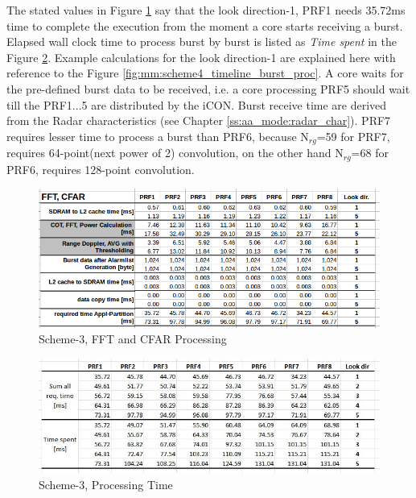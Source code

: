 The stated values in Figure \ref{fig:mm:scheme4_fft} say that the look direction-1, PRF1 needs 35.72ms time to complete the execution from the moment a core starts receiving a burst. Elapsed wall clock time to process burst by burst is listed as \textsl{Time spent} in the Figure \ref{fig:mm:scheme4_elapsed_time}. Example calculations for the look direction-1 are explained here with reference to the Figure \ref{fig:mm:scheme4_timeline_burst_proc}. A core waits for the pre-defined burst data to be received, i.e. a core processing PRF5 should wait till the PRF1...5 are distributed by the iCON. Burst receive time are derived from the Radar characteristics (see Chapter \ref{ss:aa_mode:radar_char}). PRF7 requires lesser time to process a burst than PRF6, because N$_{rg}$=59 for PRF7, requires 64-point(next power of 2) convolution, on the other hand N$_{rg}$=68 for PRF6, requires 128-point convolution.

\begin{figure}[h!]
	\centering
	\includegraphics[width=140mm]{figures/scheme4_fft}
	\caption{Scheme-3, FFT and CFAR Processing}
	\label{fig:mm:scheme4_fft}
\end{figure}

\begin{figure}[h!]
	\centering
	\includegraphics[width=140mm]{figures/scheme4_elapsed_time}
	\caption{Scheme-3, Processing Time}
	\label{fig:mm:scheme4_elapsed_time}
\end{figure}

